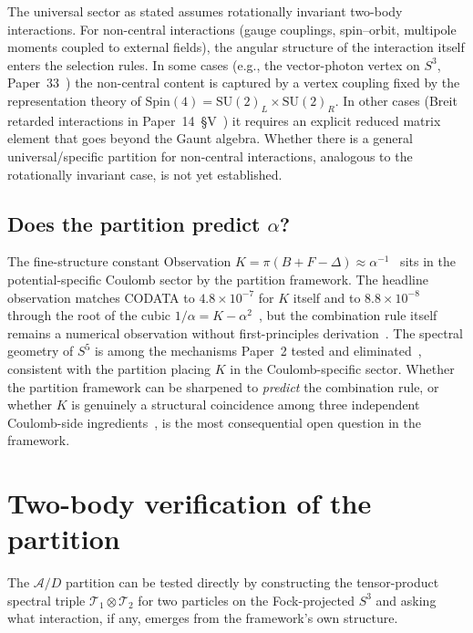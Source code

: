 \documentclass[twocolumn,pra,amsmath,amssymb,superscriptaddress]{revtex4-2}
\begin{document}
The universal sector as stated assumes rotationally invariant
two-body interactions.  For non-central interactions (gauge
couplings, spin--orbit, multipole moments coupled to external
fields), the angular structure of the interaction itself enters the
selection rules.  In some cases (e.g., the vector-photon vertex on $S^3$,
Paper~33~\cite{paper33}) the non-central content is captured by a
vertex coupling fixed by the representation theory of
$\mathrm{Spin}(4) = \mathrm{SU}(2)_L \times \mathrm{SU}(2)_R$.  In other cases (Breit retarded
interactions in Paper~14~\S V~\cite{paper14}) it requires an
explicit reduced matrix element that goes beyond the Gaunt algebra.
Whether there is a general universal/specific partition for
non-central interactions, analogous to the rotationally invariant
case, is not yet established.

\subsection{Does the partition predict $\alpha$?}

The fine-structure constant Observation
$K = \pi(B + F - \Delta) \approx \alpha^{-1}$~\cite{paper2_alpha} sits in
the potential-specific Coulomb sector by the partition framework.
The headline observation matches CODATA to $4.8\times 10^{-7}$ for
$K$ itself and to $8.8 \times 10^{-8}$ through the root of the cubic
$1/\alpha = K - \alpha^2$~\cite{paper2_alpha}, but the combination rule
itself remains a numerical observation without first-principles
derivation~\cite{curve_fit_audit}.  The spectral geometry of $S^5$ is
among the mechanisms Paper~2 tested and eliminated~\cite{paper2_alpha},
consistent with the
partition placing $K$ in the Coulomb-specific sector.  Whether the
partition framework can be sharpened to \emph{predict} the
combination rule, or whether $K$ is genuinely a structural
coincidence among three independent Coulomb-side
ingredients~\cite{paper2_alpha}, is the most consequential open
question in the framework.

\section{Two-body verification of the partition}
\label{sec:two_body}

The $\mathcal{A}/D$ partition can be tested directly by constructing
the tensor-product spectral triple
$\mathcal{T}_1 \otimes \mathcal{T}_2$ for two particles on the
Fock-projected $S^3$ and asking what interaction, if any, emerges
from the framework's own structure.
\end{document}

